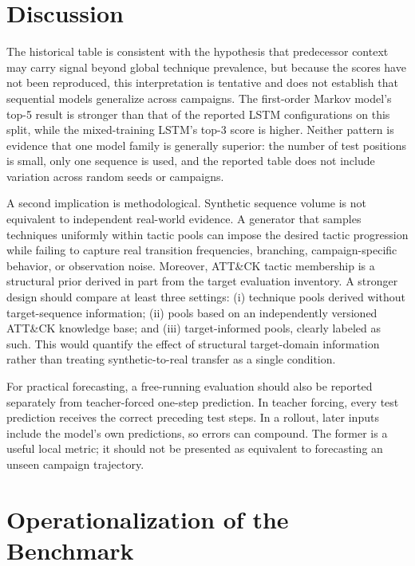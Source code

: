\documentclass[conference]{IEEEtran}
\begin{document}
\section{Discussion}
The historical table is consistent with the hypothesis that predecessor context may carry signal beyond global technique prevalence, but because the scores have not been reproduced, this interpretation is tentative and does not establish that sequential models generalize across campaigns. The first-order Markov model's top-5 result is stronger than that of the reported LSTM configurations on this split, while the mixed-training LSTM's top-3 score is higher. Neither pattern is evidence that one model family is generally superior: the number of test positions is small, only one sequence is used, and the reported table does not include variation across random seeds or campaigns.

A second implication is methodological. Synthetic sequence volume is not equivalent to independent real-world evidence. A generator that samples techniques uniformly within tactic pools can impose the desired tactic progression while failing to capture real transition frequencies, branching, campaign-specific behavior, or observation noise. Moreover, ATT\&CK tactic membership is a structural prior derived in part from the target evaluation inventory. A stronger design should compare at least three settings: (i) technique pools derived without target-sequence information; (ii) pools based on an independently versioned ATT\&CK knowledge base; and (iii) target-informed pools, clearly labeled as such. This would quantify the effect of structural target-domain information rather than treating synthetic-to-real transfer as a single condition.

For practical forecasting, a free-running evaluation should also be reported separately from teacher-forced one-step prediction. In teacher forcing, every test prediction receives the correct preceding test steps. In a rollout, later inputs include the model's own predictions, so errors can compound. The former is a useful local metric; it should not be presented as equivalent to forecasting an unseen campaign trajectory.

\section{Operationalization of the Benchmark}
\end{document}
